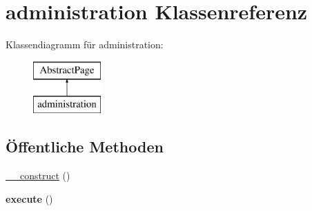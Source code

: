 \hypertarget{classadministration}{}\section{administration Klassenreferenz}
\label{classadministration}
Klassendiagramm für administration\+:\begin{figure}[H]
\begin{center}
\leavevmode
\includegraphics[height=2.000000cm]{classadministration}
\end{center}
\end{figure}
\subsection*{Öffentliche Methoden}
\begin{DoxyCompactItemize}
\item 
\mbox{\hyperlink{classadministration_a68add3e03abc47be850569bb51b112e7}{\+\_\+\+\_\+construct}} ()
\item 
\mbox{\label{classadministration_af2f343e495c8b6b51cf7f5906304296f}} 
{\bfseries execute} ()
\end{DoxyCompactItemize}
